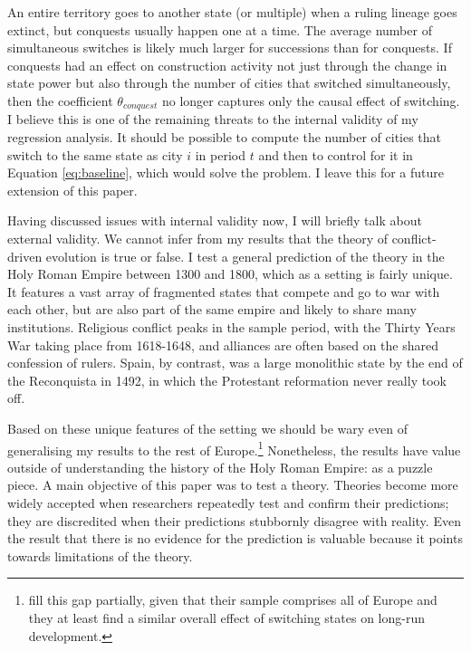 \documentclass[11pt, a4paper]{article}
\begin{document}
An entire territory goes to another state (or multiple) when a ruling lineage goes extinct, but conquests usually happen one at a time. The average number of simultaneous switches is likely much larger for successions than for conquests. If conquests had an effect on construction activity not just through the change in state power but also through the number of cities that switched simultaneously, then the coefficient $\theta_{conquest}$ no longer captures only the causal effect of switching. I believe this is one of the remaining threats to the internal validity of my regression analysis. It should be possible to compute the number of cities that switch to the same state as city $i$ in period $t$ and then to control for it in Equation \ref{eq:baseline}, which would solve the problem. I leave this for a future extension of this paper.

Having discussed issues with internal validity now, I will briefly talk about external validity. We cannot infer from my results that the theory of conflict-driven evolution is true or false. I test a general prediction of the theory in the Holy Roman Empire between 1300 and 1800, which as a setting is fairly unique. It features a vast array of fragmented states that compete and go to war with each other, but are also part of the same empire and likely to share many institutions. Religious conflict peaks in the sample period, with the Thirty Years War taking place from 1618-1648, and alliances are often based on the shared confession of rulers. Spain, by contrast, was a large monolithic state by the end of the Reconquista in 1492, in which the Protestant reformation never really took off.

Based on these unique features of the setting we should be wary even of generalising my results to the rest of Europe.\footnote
{
\cite{schoenholzer2022} fill this gap partially, given that their sample comprises all of Europe and they at least find a similar overall effect of switching states on long-run development.
}
Nonetheless, the results have value outside of understanding the history of the Holy Roman Empire: as a puzzle piece. A main objective of this paper was to test a theory. Theories become more widely accepted when researchers repeatedly test and confirm their predictions; they are discredited when their predictions stubbornly disagree with reality. Even the result that there is no evidence for the prediction is valuable because it points towards limitations of the theory.
\end{document}
